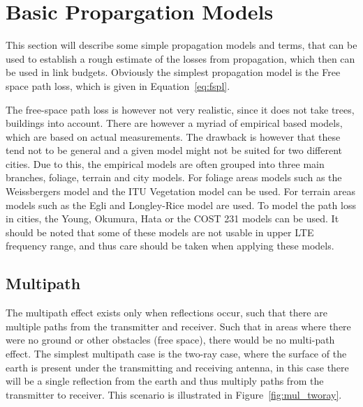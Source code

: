 \section{Basic Propargation Models}
This section will describe some simple propagation models and terms, that can be used to establish a rough estimate of the losses from propagation, which then can be used in link budgets. Obviously the simplest propagation model is the Free space path loss, which is given in Equation~\ref{eq:fspl}.

The free-space path loss is however not very realistic, since it does not take trees, buildings into account\cite{balanis2012antenna}. There are however a myriad of empirical based models, which are based on actual measurements. The drawback is however that these tend not to be general and a given model might not be suited for two different cities. Due to this, the empirical models are often grouped into three main branches, foliage, terrain and city models\cite{goldsmith2005wireless}. For foliage areas models such as the Weissbergers model and the ITU Vegetation model can be used\cite{goldsmith2005wireless}. For terrain areas models such as the Egli and Longley-Rice model are used\cite{goldsmith2005wireless}. To model the path loss in cities, the Young, Okumura, Hata or the COST 231 models can be used\cite{goldsmith2005wireless}. It should be noted that some of these models are not usable in upper LTE frequency range, and thus care should be taken when applying these models. 


\subsection{Multipath}
The multipath effect exists only when reflections occur, such that there are multiple paths from the transmitter and receiver. Such that in areas where there were no ground or other obstacles (free space), there would be no multi-path effect. The simplest multipath case is the two-ray case, where the surface of the earth is present under the transmitting and receiving antenna, in this case there will be a single reflection from the earth and thus multiply paths from the transmitter to receiver. This scenario is illustrated in Figure~\ref{fig:mul_tworay}.
 
